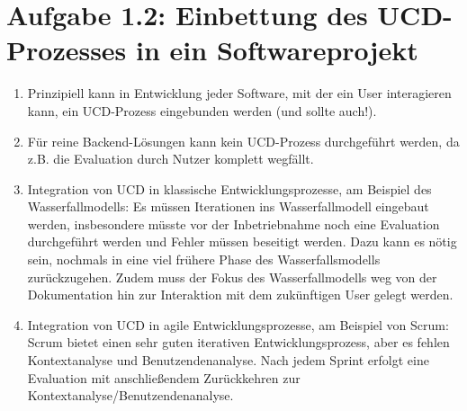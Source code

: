 \documentclass{article}
\begin{document}
	\section*{Aufgabe 1.2: Einbettung des UCD-Prozesses in ein Softwareprojekt}
	\begin{enumerate}[label=(\alph*)]
		\item Prinzipiell kann in Entwicklung jeder Software, mit der ein User interagieren kann, ein UCD-Prozess eingebunden werden (und sollte auch!).
		\item Für reine Backend-Lösungen kann kein UCD-Prozess durchgeführt werden, da z.B. die Evaluation durch Nutzer komplett wegfällt.
		\item Integration von UCD in klassische Entwicklungsprozesse, am Beispiel des Wasserfallmodells: Es müssen Iterationen ins Wasserfallmodell eingebaut werden, insbesondere müsste vor der Inbetriebnahme noch eine Evaluation durchgeführt werden und Fehler müssen beseitigt werden. Dazu kann es nötig sein, nochmals in eine viel frühere Phase des Wasserfallsmodells zurückzugehen. Zudem muss der Fokus des Wasserfallmodells weg von der Dokumentation hin zur Interaktion mit dem zukünftigen User gelegt werden.
		\item Integration von UCD in agile Entwicklungsprozesse, am Beispiel von Scrum: Scrum bietet einen sehr guten iterativen Entwicklungsprozess, aber es fehlen Kontextanalyse und Benutzendenanalyse. Nach jedem Sprint erfolgt eine Evaluation mit anschließendem Zurückkehren zur Kontextanalyse/Benutzendenanalyse.
	\end{enumerate}
	
\end{document}
